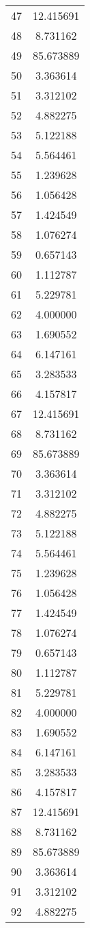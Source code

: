 \documentclass[12pt]{article}
\begin{document}
\begin{longtable}{@{}cc@{}}
47 & 12.415691 \\
48 & 8.731162 \\
49 & 85.673889 \\
50 & 3.363614 \\
51 & 3.312102 \\
52 & 4.882275 \\
53 & 5.122188 \\
54 & 5.564461 \\
55 & 1.239628 \\
56 & 1.056428 \\
57 & 1.424549 \\
58 & 1.076274 \\
59 & 0.657143 \\
60 & 1.112787 \\
61 & 5.229781 \\
62 & 4.000000 \\
63 & 1.690552 \\
64 & 6.147161 \\
65 & 3.283533 \\
66 & 4.157817 \\
67 & 12.415691 \\
68 & 8.731162 \\
69 & 85.673889 \\
70 & 3.363614 \\
71 & 3.312102 \\
72 & 4.882275 \\
73 & 5.122188 \\
74 & 5.564461 \\
75 & 1.239628 \\
76 & 1.056428 \\
77 & 1.424549 \\
78 & 1.076274 \\
79 & 0.657143 \\
80 & 1.112787 \\
81 & 5.229781 \\
82 & 4.000000 \\
83 & 1.690552 \\
84 & 6.147161 \\
85 & 3.283533 \\
86 & 4.157817 \\
87 & 12.415691 \\
88 & 8.731162 \\
89 & 85.673889 \\
90 & 3.363614 \\
91 & 3.312102 \\
92 & 4.882275 \\

\end{longtable}
\end{document}
